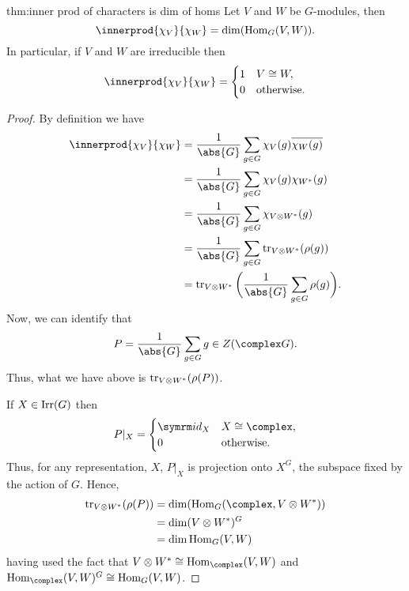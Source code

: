 \begin{thm}{}{thm:inner prod of characters is dim of homs}
    Let \(V\) and \(W\) be \(G\)-modules, then
    \begin{equation}
        \innerprod{\chi_V}{\chi_W} = \dim(\Hom_G(V, W)).
    \end{equation}
    In particular, if \(V\) and \(W\) are irreducible then
    \begin{equation}
        \innerprod{\chi_V}{\chi_W} =
        \begin{cases}
            1 & V \isomorphic W,\\
            0 & \text{otherwise}.
        \end{cases}
    \end{equation}
    \begin{proof}
        By definition we have
        \begin{align}
            \innerprod{\chi_V}{\chi_W} &= \frac{1}{\abs{G}} \sum_{g \in G} \chi_V(g) \overline{\chi_W(g)}\\
            &= \frac{1}{\abs{G}} \sum_{g \in G} \chi_V(g) \chi_{W^*}(g)\\
            &= \frac{1}{\abs{G}} \sum_{g \in G} \chi_{V \otimes W^*}(g)\\
            &= \frac{1}{\abs{G}} \sum_{g \in G} \tr_{V \otimes W^*}(\rho(g))\\
            &= \tr_{V \otimes W^*}\bigg( \frac{1}{\abs{G}} \sum_{g \in G} \rho(g) \bigg).
        \end{align}
        Now, we can identify that
        \begin{equation}
            P = \frac{1}{\abs{G}} \sum_{g \in G} g \in Z(\complex G).
        \end{equation}
        Thus, what we have above is \(\operatorname{tr}_{V \otimes W^*}(\rho(P))\).
        
        If \(X \in \operatorname{Irr}(G)\) then
        \begin{equation}
            P|_X =
            \begin{cases}
                \id_X & X \isomorphic \complex,\\
                0 & \text{otherwise}.
            \end{cases}
        \end{equation}
        Thus, for any representation, \(X\), \(P|_X\) is projection onto \(X^G\), the subspace fixed by the action of \(G\).
        Hence,
        \begin{align}
            \tr_{V \otimes W^*}(\rho(P)) &= \dim(\Hom_G(\complex, V \otimes W^*))\\
            &= \dim(V \otimes W^*)^G\\
            &= \dim \Hom_G(V, W)
        \end{align}
        having used the fact that \(V \otimes W^* \isomorphic \Hom_{\complex}(V, W)\) and \(\Hom_{\complex}(V, W)^G \isomorphic \Hom_G(V, W)\).
    \end{proof}
\end{thm}

